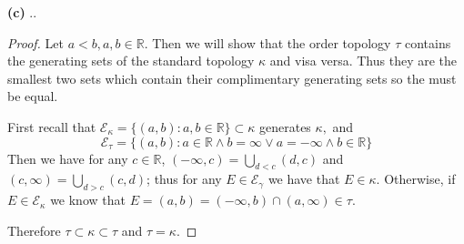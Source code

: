 \documentclass[11pt]{amsart}
\theoremstyle{definition}
\numberwithin{theorem}{section}
\numberwithin{definition}{section}
\numberwithin{equation}{section}
\def\scripte{{\mathcal E}}
\begin{document}
\noindent \textbf{(c)} ..
\begin{proof}
	Let $a < b, a,b \in \mathbb{R}.$ Then we will show that the order topology $\tau$ contains the generating sets of the standard topology $\kappa$ and visa versa. Thus they are the smallest two sets which contain their complimentary generating sets so the must be equal.

	First recall that $\scripte_\kappa = \{(a,b) : a,b \in {\mathbb{R}}\} \subset \kappa$ generates $\kappa,$ and $$\scripte_\tau = \{(a,b) : a \in \mathbb{R}\wedge b = \infty \vee a = -\infty \wedge b \in \mathbb{R}\}$$ Then we have for any $c \in \mathbb{R}$, $(-\infty,c) = \bigcup_{d < c} (d,c)$ and $(c, \infty) = \bigcup_{d >c} (c,d)$;
	thus for any $E \in \scripte_\gamma$ we have that $E \in \kappa.$ Otherwise, if $E \in \scripte_\kappa$ we know that $E = (a,b) = (-\infty, b) \cap (a, \infty) \in \tau$. 

	Therefore $\tau \subset \kappa \subset \tau$ and $\tau = \kappa.$
\end{proof}
\end{document}
